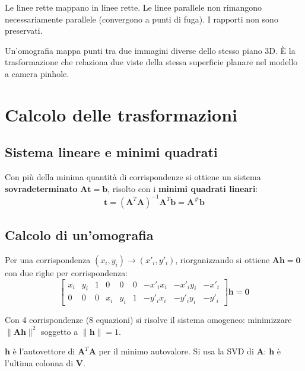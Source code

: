 \documentclass[12pt, a4paper]{report}
\begin{document}
\begin{propbox}[Proprietà]
Le linee rette mappano in linee rette. Le linee parallele non rimangono
necessariamente parallele (convergono a punti di fuga). I rapporti non sono
preservati.
\end{propbox}

\begin{notebox}[Applicazione]
Un'omografia mappa punti tra due immagini diverse dello stesso piano 3D.
\`E la trasformazione che relaziona due viste della stessa superficie planare
nel modello a camera pinhole.
\end{notebox}

\section{Calcolo delle trasformazioni}

\subsection{Sistema lineare e minimi quadrati}

Con più della minima quantità di corrispondenze si ottiene un sistema
\textbf{sovradeterminato} $\mathbf{At}=\mathbf{b}$, risolto con i
\textbf{minimi quadrati lineari}:
\[
  \mathbf{t}=(\mathbf{A}^T\mathbf{A})^{-1}\mathbf{A}^T\mathbf{b}=\mathbf{A}^\#\mathbf{b}
\]

\subsection{Calcolo di un'omografia}

Per una corrispondenza $(x_i,y_i)\to(x'_i,y'_i)$, riorganizzando si ottiene
$\mathbf{Ah}=\mathbf{0}$ con due righe per corrispondenza:
\[
  \begin{bmatrix}
    x_i&y_i&1&0&0&0&-x'_ix_i&-x'_iy_i&-x'_i\\
    0&0&0&x_i&y_i&1&-y'_ix_i&-y'_iy_i&-y'_i
  \end{bmatrix}\mathbf{h}=\mathbf{0}
\]

Con 4 corrispondenze (8 equazioni) si risolve il sistema omogeneo:
minimizzare $\|\mathbf{Ah}\|^2$ soggetto a $\|\mathbf{h}\|=1$.

\begin{notebox}
$\mathbf{h}$ è l'autovettore di $\mathbf{A}^T\mathbf{A}$ per il minimo
autovalore. Si usa la SVD di $\mathbf{A}$: $\mathbf{h}$ è l'ultima colonna di
$\mathbf{V}$.
\end{notebox}
\end{document}

